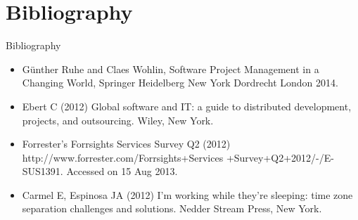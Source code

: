\documentclass[10pt]{beamer}
\begin{document}
\section{Bibliography}
\begin{frame}{Bibliography}{}

	\begin{itemize}
		\item<1->Günther Ruhe and Claes Wohlin, Software Project 	Management in a Changing World, Springer Heidelberg New York Dordrecht London 2014.
		\item<1->Ebert C (2012) Global software and IT: a guide to distributed development, projects, and outsourcing. Wiley, New York. 
		\item<1->Forrester’s Forrsights Services Survey Q2 (2012) http://www.forrester.com/Forrsights+Services	+Survey+Q2+2012/-/E-SUS1391. Accessed on 15 Aug 2013.
		\item<1->Carmel E, Espinosa JA (2012) I’m working while they’re sleeping: time zone separation challenges and solutions. Nedder Stream Press, New York.
	\end{itemize}
\end{frame}




{\aauwavesbg
\begin{frame}
\end{frame}}
\end{document}
